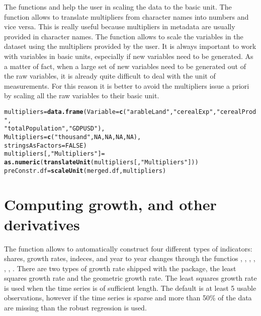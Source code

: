 \documentclass[nojss]{jss}\usepackage[]{graphicx}\usepackage[]{color}
\makeatletter
\newcommand{\hlnum}[1]{\textcolor[rgb]{0.686,0.059,0.569}{#1}}%
\newcommand{\hlstr}[1]{\textcolor[rgb]{0.192,0.494,0.8}{#1}}%
\newcommand{\hlstd}[1]{\textcolor[rgb]{0.345,0.345,0.345}{#1}}%
\newcommand{\hlkwb}[1]{\textcolor[rgb]{0.69,0.353,0.396}{#1}}%
\newcommand{\hlkwc}[1]{\textcolor[rgb]{0.333,0.667,0.333}{#1}}%
\newcommand{\hlkwd}[1]{\textcolor[rgb]{0.737,0.353,0.396}{\textbf{#1}}}%
\newenvironment{kframe}{%
 \def\at@end@of@kframe{}%
 \ifinner\ifhmode%
  \def\at@end@of@kframe{\end{minipage}}%
  \begin{minipage}{\columnwidth}%
 \fi\fi%
 \def\FrameCommand##1{\hskip\@totalleftmargin \hskip-\fboxsep
 \colorbox{shadecolor}{##1}\hskip-\fboxsep
     \hskip-\linewidth \hskip-\@totalleftmargin \hskip\columnwidth}%
 \MakeFramed {\advance\hsize-\width
   \@totalleftmargin\z@ \linewidth\hsize
   \@setminipage}}%
 {\par\unskip\endMakeFramed%
 \at@end@of@kframe}
\newenvironment{knitrout}{}{} %
\makeatother
\begin{document}
The functions  and  help the user in scaling the data to the basic unit. The function  allows to translate multipliers from character names into numbers and vice versa. This is really useful because multipliers in metadata are usually provided in character names. The function  allows to scale the variables in the dataset using the multipliers provided by the user. It is always important to work with variables in basic units, especially if new variables need to be generated. As a matter of fact, when a large set of new variables need to be generated out of the raw variables, it is already quite difficult to deal with the unit of measurements. For this reason it is better to avoid the multipliers issue a priori by scaling all the raw variables to their basic unit.

\begin{knitrout}
\color{fgcolor}\begin{kframe}
\begin{alltt}
\hlstd{multipliers} \hlkwb{=} \hlkwd{data.frame}\hlstd{(}\hlkwc{Variable} \hlstd{=} \hlkwd{c}\hlstd{(}\hlstr{"arableLand"}\hlstd{,} \hlstr{"cerealExp"}\hlstd{,} \hlstr{"cerealProd"}\hlstd{,}
                                      \hlstr{"totalPopulation"}\hlstd{,} \hlstr{"GDPUSD"}\hlstd{),}
                         \hlkwc{Multipliers} \hlstd{=} \hlkwd{c}\hlstd{(}\hlstr{"thousand"}\hlstd{,} \hlnum{NA}\hlstd{,} \hlnum{NA}\hlstd{,} \hlnum{NA}\hlstd{,} \hlnum{NA}\hlstd{),}
                         \hlkwc{stringsAsFactors} \hlstd{=} \hlnum{FALSE}\hlstd{)}
\hlstd{multipliers[,} \hlstr{"Multipliers"}\hlstd{]} \hlkwb{=}
  \hlkwd{as.numeric}\hlstd{(}\hlkwd{translateUnit}\hlstd{(multipliers[,} \hlstr{"Multipliers"}\hlstd{]))}
\hlstd{preConstr.df} \hlkwb{=} \hlkwd{scaleUnit}\hlstd{(merged.df, multipliers)}
\end{alltt}
\end{kframe}
\end{knitrout}

\section{Computing growth, and other derivatives}
The function  allows to automatically construct four different types of indicators: shares, growth rates, indeces, and year to year changes through the functios , , , , , , . There are two types of growth rate shipped with the package, the least squares growth rate and the geometric growth rate. The least squares growth rate is used when the time series is of sufficient length. The default is at least 5 usable observations, however if the time series is sparse and more than 50\% of the data are missing than the robust regression is used.
\end{document}
